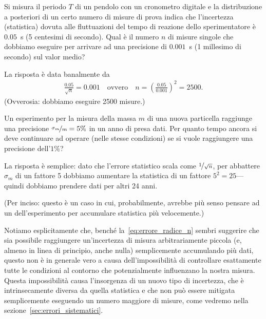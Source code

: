\begin{examplebox}
  \begin{example}
    Si misura il periodo $T$ di un pendolo con un cronometro digitale e la
    distribuzione a posteriori di un certo numero di misure di prova indica che
    l'incertezza (statistica) dovuta alle fluttuazioni del tempo di reazione
    dello sperimentatore è $0.05$~s (5 centesimi di secondo). Qual è il
    numero $n$ di misure singole che dobbiamo eseguire per arrivare ad una
    precisione di $0.001$~s (1 millesimo di secondo) sul valor medio?

    La risposta è data banalmente da
    \begin{align*}
      \frac{0.05}{\sqrt{n}} = 0.001 \quad \text{ovvero} \quad
      n = \left(\frac{0.05}{0.001}\right)^2 = 2500.
    \end{align*}
    (Ovverosia: dobbiamo eseguire 2500 misure.)
  \end{example}

  \begin{example}
    Un esperimento per la misura della massa $m$ di una nuova particella
    raggiunge una precisione $\nicefrac{\sigma_{m}}{m} = 5\%$ in un anno di
    presa dati. Per quanto tempo ancora si deve continuare ad operare (nelle
    stesse condizioni) se si vuole raggiungere una precisione dell'$1\%$?

    La risposta è semplice: dato che l'errore statistico scala come
    $\nicefrac{1}{\sqrt{n}}$, per abbattere $\sigma_m$ di un fattore 5
    dobbiamo aumentare la statistica di un fattore $5^2 = 25$---quindi dobbiamo
    prendere dati per altri 24 anni.

    (Per inciso: questo è un caso in cui, probabilmente, avrebbe più senso
    pensare ad un  dell'esperimento per accumulare statistica
    più velocemente.)
  \end{example}
\end{examplebox}

Notiamo esplicitamente che, benché la~\eqref{eq:errore_radice_n} sembri
suggerire che sia possibile raggiungere un'incertezza di misura arbitrariamente
piccola (e, almeno in linea di principio, anche nulla) semplicemente
accumulando più dati, questo non è in generale vero a causa
dell'impossibilità di controllare esattamente tutte le condizioni al contorno
che potenzialmente influenzano la nostra misura. Questa impossibilità causa
l'insorgenza di un nuovo tipo di incertezza, che è intrinsecamente diversa
da quella statistica e che non può essere mitigata semplicemente eseguendo un
numero maggiore di misure, come vedremo nella
sezione~\ref{sec:errori_sistematici}.


